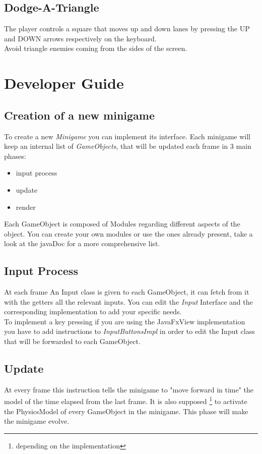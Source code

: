 \documentclass[a4paper,12pt]{report}
\begin{document}
\section*{Dodge-A-Triangle}
The player controls a square that moves up and down lanes by pressing the UP and DOWN arrows respectively on the keyboard.\\
Avoid triangle enemies coming from the sides of the screen.

\chapter{Developer Guide}
\section*{Creation of a new minigame}
To create a new \textit{Minigame} you can implement its interface.
Each minigame will keep an internal list of \textit{GameObjects}, that will be updated each frame in 3 main phases:
\begin{itemize}
	\item input process
	\item update
	\item render
\end{itemize}
Each GameObject is composed of Modules regarding different aspects of the object.
You can create your own modules or use the ones already present, take a look at the javaDoc for a more comprehensive list.
\section*{Input Process}
At each frame An Input class is given to each GameObject, it can fetch from it with the getters all the relevant inputs.
You can edit the \textit{Input} Interface and the corresponding implementation to add your specific needs.\\
To implement a key pressing if you are using the JavaFxView implementation you have to add instructions to \textit{InputButtonsImpl} in order to edit the Input class that will be forwarded to each GameObject.

\section*{Update}
At every frame this instruction tells the minigame to "move forward in time" the model of the time elapsed from the last frame. It is also supposed \footnote{depending on the implementation} to activate the PhysicsModel of every GameObject in the minigame.
This phase will make the minigame evolve.
\end{document}
